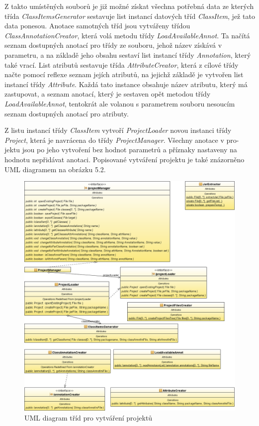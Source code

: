 \documentclass{projekt}
\begin{document}
Z takto umístěných souborů je již možné získat všechna potřebná data ze kterých třída {\it ClassItemsGenerator} sestavuje list instancí datových tříd {\it ClassItem}, jež tato data ponesou. 
Anotace samotných tříd jsou vytvářeny třídou {\it ClassAnnotationCreator}, která volá metodu třídy {\it LoadAvailableAnnot}. Ta načítá seznam dostupných anotací pro třídy ze souboru, jehož název získává v parametru, a na základě jeho obsahu sestaví list instancí třídy {\it Annotation}, který také vrací. 
List atributů sestavuje třída {\it AttributeCreator}, která z cílové třídy načte pomocí reflexe seznam jejích atributů, na jejichž základě je vytvořen list instancí třídy {\it Attribute}. Každá tato instance obsahuje název atributu, který má zastupovat, a seznam anotací, který je sestaven opět metodou třídy {\it LoadAvailableAnnot}, tentokrát ale volanou s parametrem souboru nesoucím seznam dostupných anotací pro atributy.


Z listu instancí třídy {\it ClassItem} vytvoří {\it ProjectLoader} novou instanci třídy {\it Project}, která je navrácena do třídy {\it ProjectManager}. 
Všechny anotace v pro-\\jektu jsou po jeho vytvoření bez hodnot parametrů a příznaky nastaveny na hodnotu nepřidávat anotaci. Popisované vytváření projektu je také znázorněno UML diagramem na obrázku 5.2.

\begin{figure}[htb!]
\begin{center}
\includegraphics[scale=0.38]{Aplikacni1.png}
\caption{UML diagram tříd pro vytváření projektů}
\end{center}
\end{figure}
\end{document}
